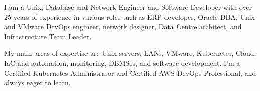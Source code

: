 
I am a Unix, Database and Network Engineer and Software Developer with over 25 years of experience in various roles such as ERP developer, Oracle DBA, Unix and VMware DevOps engineer, network designer, Data Centre architect, and Infrastructure Team Leader.
\par
My main areas of expertise are Unix servers, LANs, VMware, Kubernetes, Cloud, IaC and automation, monitoring, DBMSes, and software development. I'm a Certified Kubernetes Administrator and Certified AWS DevOps Professional, and always eager to learn.
